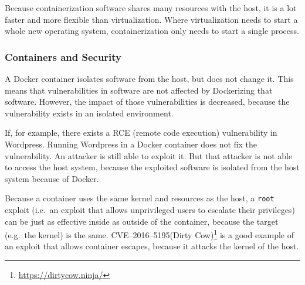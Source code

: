 
Because containerization software shares many resources with the host, it is a lot faster and more flexible than virtualization. Where virtualization needs to start a whole new operating system, containerization only needs to start a single process.

\subsubsection{Containers and Security}
A Docker container isolates software from the host, but does not change it. This means that vulnerabilities in software are not affected by Dockerizing that software. However, the impact of those vulnerabilities is decreased, because the vulnerability exists in an isolated environment.

If, for example, there exists a RCE (remote code execution) vulnerability in Wordpress. Running Wordpress in a Docker container does not fix the vulnerability. An attacker is still able to exploit it. But that attacker is not able to access the host system, because the exploited software is isolated from the host system because of Docker.

\hfill

Because a container uses the same kernel and resources as the host, a \lstinline{root} exploit (i.e.\ an exploit that allows unprivileged users to escalate their privileges) can be just as effective inside as outside of the container, because the target (e.g.\ the kernel) is the same. CVE--2016--5195(Dirty Cow)\footnote{\url{https://dirtycow.ninja/}} is a good example of an exploit that allows container escapes\cite{Dirty-Cow-Escape}, because it attacks the kernel of the host.
